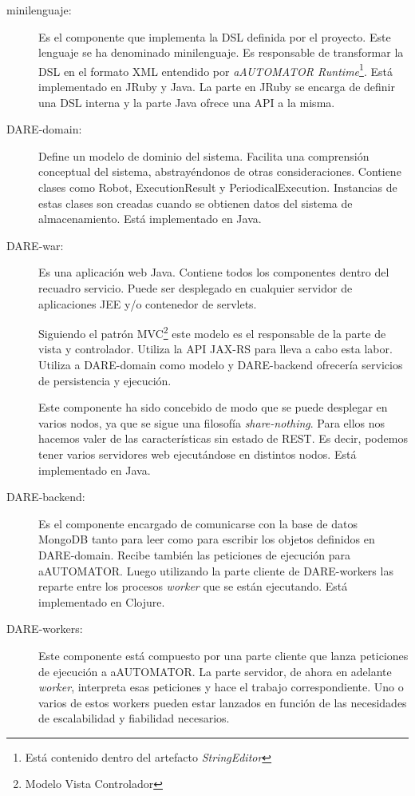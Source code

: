 \begin{description}

\item[minilenguaje:] Es el componente que implementa la DSL definida
  por el proyecto. Este lenguaje se ha denominado minilenguaje. Es
  responsable de transformar la DSL en el formato XML entendido por
  \emph{aAUTOMATOR Runtime}\footnote{Está contenido dentro del
    artefacto \emph{StringEditor}}. Está implementado en JRuby y
  Java. La parte en JRuby se encarga de definir una DSL interna y la
  parte Java ofrece una API a la misma.
\item[DARE-domain:] Define un modelo de dominio del sistema. Facilita
  una comprensión conceptual del sistema, abstrayéndonos de otras
  consideraciones. Contiene clases como Robot, ExecutionResult y
  PeriodicalExecution. Instancias de estas clases son creadas cuando
  se obtienen datos del sistema de almacenamiento. Está implementado
  en Java.
\item[DARE-war:] Es una aplicación web Java. Contiene todos los
  componentes dentro del recuadro servicio. Puede ser desplegado en
  cualquier servidor de aplicaciones JEE y/o contenedor de servlets.

  Siguiendo el patrón MVC\footnote{Modelo Vista Controlador} este
  modelo es el responsable de la parte de vista y controlador. Utiliza
  la API JAX-RS para lleva a cabo esta labor. Utiliza a DARE-domain
  como modelo y DARE-backend ofrecería servicios de persistencia y
  ejecución.

  Este componente ha sido concebido de modo que se puede desplegar en
  varios nodos, ya que se sigue una filosofía
  \emph{share-nothing}. Para ellos nos hacemos valer de las
  características sin estado de REST. Es decir, podemos tener varios
  servidores web ejecutándose en distintos nodos. Está implementado en
  Java.

\item[DARE-backend:] Es el componente encargado de comunicarse con la
  base de datos MongoDB tanto para leer como para escribir los objetos
  definidos en DARE-domain. Recibe también las peticiones de ejecución
  para aAUTOMATOR. Luego utilizando la parte cliente de DARE-workers
  las reparte entre los procesos \emph{worker} que se están
  ejecutando. Está implementado en Clojure.

\item[DARE-workers:] Este componente está compuesto por una parte
  cliente que lanza peticiones de ejecución a aAUTOMATOR. La parte
  servidor, de ahora en adelante \emph{worker}, interpreta esas
  peticiones y hace el trabajo correspondiente. Uno o varios de estos
  workers pueden estar lanzados en función de las necesidades de
  escalabilidad y fiabilidad necesarios.


\end{description}
